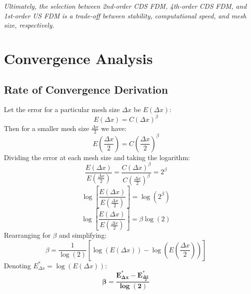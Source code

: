 \documentclass[10pt, reqno]{article}		%
\numberwithin{equation}{section}
\begin{document}
\vspace{30pt}

\textit{Ultimately, the selection between 2nd-order CDS FDM, 4th-order CDS FDM, and 1st-order US FDM is a trade-off between stability, computational speed, and mesh size, respectively.}

\newpage

\section{Convergence Analysis}

\subsection{Rate of Convergence Derivation}

Let the error for a particular mesh size $\Delta x$ be $E\left(\Delta x\right)$:
\begin{equation}
E\left(\Delta x\right) = C\left(\Delta x\right)^\beta
\end{equation}
Then for a smaller mesh size $\frac{\Delta x}{2}$ we have:
\begin{equation}
E\left(\frac{\Delta x}{2}\right) = C\left(\frac{\Delta x}{2}\right)^\beta
\end{equation}
Dividing the error at each mesh size and taking the logarithm:
\begin{equation}
\frac{E\left(\Delta x\right)}{E\left(\frac{\Delta x}{2}\right)} = \frac{C\left(\Delta x\right)^\beta}{C\left(\frac{\Delta x}{2}\right)^\beta} = 2^\beta
\end{equation}
\begin{equation}
\log\left[\frac{E\left(\Delta x\right)}{E\left(\frac{\Delta x}{2}\right)}\right] = \log(2^\beta)
\end{equation}
\begin{equation}
\log\left[\frac{E\left(\Delta x\right)}{E\left(\frac{\Delta x}{2}\right)}\right] = \beta \log(2)
\end{equation}
Rearranging for $\beta$ and simplifying:
\begin{equation}
\beta = \frac{1}{\log(2)} \left[\log\left(E\left(\Delta x\right)\right) - \log\left(E\left(\frac{\Delta x}{2}\right)\right)\right] 
\end{equation}
Denoting $E^*_{\Delta x} = \log\left(E\left(\Delta x\right)\right)$:
\begin{equation}
\mathbf{\beta = \frac{E^*_{\Delta x} - E^*_{\frac{\Delta x}{2}}}{\log (2)}}
\end{equation}
\end{document}
